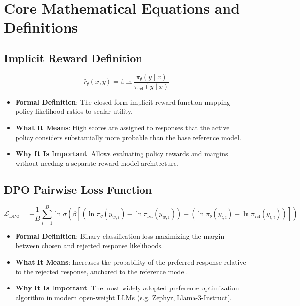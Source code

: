 \documentclass[11pt,a4paper]{article}
\theoremstyle{definition}
\begin{document}
\section{Core Mathematical Equations and Definitions}

\subsection{Implicit Reward Definition}
{\boldmath
\begin{equation}
\hat{r}_\theta(x, y) = \beta \ln \frac{\pi_\theta(y \mid x)}{\pi_{\text{ref}}(y \mid x)}
\end{equation}
}
\begin{itemize}
    \item \textbf{Formal Definition}: The closed-form implicit reward function mapping policy likelihood ratios to scalar utility.
    \item \textbf{What It Means}: High scores are assigned to responses that the active policy considers substantially more probable than the base reference model.
    \item \textbf{Why It Is Important}: Allows evaluating policy rewards and margins without needing a separate reward model architecture.
\end{itemize}

\subsection{DPO Pairwise Loss Function}
{\boldmath
\begin{equation}
\mathcal{L}_{\text{DPO}} = - \frac{1}{B}\sum_{i=1}^B \ln \sigma\left( \beta \left[ \left( \ln \pi_\theta(y_{w, i}) - \ln \pi_{\text{ref}}(y_{w, i}) \right) - \left( \ln \pi_\theta(y_{l, i}) - \ln \pi_{\text{ref}}(y_{l, i}) \right) \right] \right)
\end{equation}
}
\begin{itemize}
    \item \textbf{Formal Definition}: Binary classification loss maximizing the margin between chosen and rejected response likelihoods.
    \item \textbf{What It Means}: Increases the probability of the preferred response relative to the rejected response, anchored to the reference model.
    \item \textbf{Why It Is Important}: The most widely adopted preference optimization algorithm in modern open-weight LLMs (e.g. Zephyr, Llama-3-Instruct).
\end{itemize}
\end{document}
